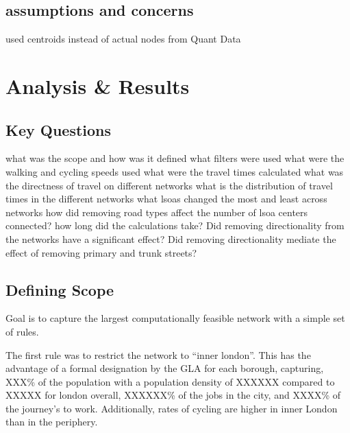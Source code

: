\documentclass[11pt]{article} %
\begin{document}
\subsection{assumptions and concerns}

used centroids instead of actual nodes from Quant Data


\section{Analysis \& Results}


\subsection{Key Questions}
what was the scope and how was it defined
what filters were used
what were the walking and cycling speeds used
what were the travel times calculated
what was the directness of travel on different networks
what is the distribution of travel times in the different networks
what lsoas changed the most and least across networks
how did removing road types affect the number of lsoa centers connected?
how long did the calculations take?
Did removing directionality from the networks have a significant effect?
Did removing directionality mediate the effect of removing primary and trunk streets?




\subsection{Defining Scope}



Goal is to capture the largest computationally feasible network with a simple set of rules. 

The first rule was to restrict the network to ``inner london''. This has the advantage of a formal designation by the GLA for each borough, capturing, XXX\% of the population with a population density of XXXXXX compared to XXXXX for london overall, XXXXXX\% of the jobs in the city, and XXXX\% of the journey's to work. Additionally, rates of cycling are higher in inner London than in the periphery. 
\end{document}
